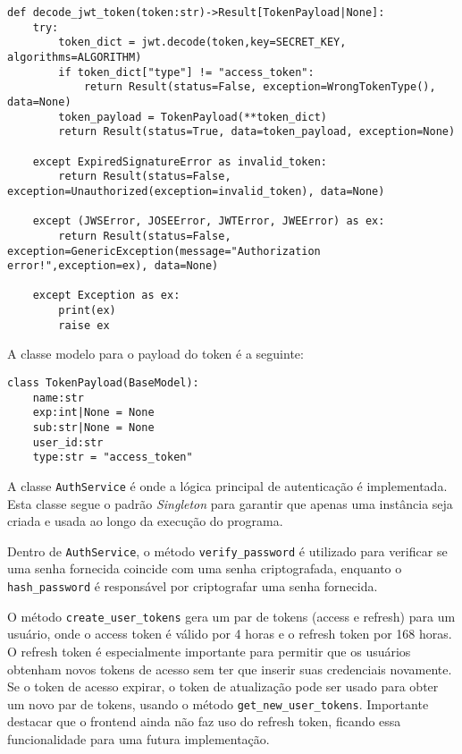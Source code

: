\begin{verbatim}
def decode_jwt_token(token:str)->Result[TokenPayload|None]:
    try:
        token_dict = jwt.decode(token,key=SECRET_KEY, algorithms=ALGORITHM)
        if token_dict["type"] != "access_token":
            return Result(status=False, exception=WrongTokenType(), data=None)
        token_payload = TokenPayload(**token_dict)
        return Result(status=True, data=token_payload, exception=None)
    
    except ExpiredSignatureError as invalid_token:
        return Result(status=False, exception=Unauthorized(exception=invalid_token), data=None)

    except (JWSError, JOSEError, JWTError, JWEError) as ex:
        return Result(status=False, exception=GenericException(message="Authorization error!",exception=ex), data=None)

    except Exception as ex:
        print(ex)
        raise ex
\end{verbatim}

A classe modelo para o payload do token é a seguinte:
\begin{verbatim}
class TokenPayload(BaseModel):
    name:str
    exp:int|None = None
    sub:str|None = None
    user_id:str
    type:str = "access_token"
\end{verbatim}

A classe \texttt{AuthService} é onde a lógica principal de autenticação é implementada. Esta classe segue o padrão \textit{Singleton} para garantir que apenas uma instância seja criada e usada ao longo da execução do programa.

Dentro de \texttt{AuthService}, o método \texttt{verify\_password} é utilizado para verificar se uma senha fornecida coincide com uma senha criptografada, enquanto o \texttt{hash\_password} é responsável por criptografar uma senha fornecida.

O método \texttt{create\_user\_tokens} gera um par de tokens (access e refresh) para um usuário, onde o access token é válido por 4 horas e o refresh token por 168 horas. O refresh token é especialmente importante para permitir que os usuários obtenham novos tokens de acesso sem ter que inserir suas credenciais novamente. Se o token de acesso expirar, o token de atualização pode ser usado para obter um novo par de tokens, usando o método \texttt{get\_new\_user\_tokens}. Importante destacar que o frontend ainda não faz uso do refresh token, ficando essa funcionalidade para uma futura implementação.

